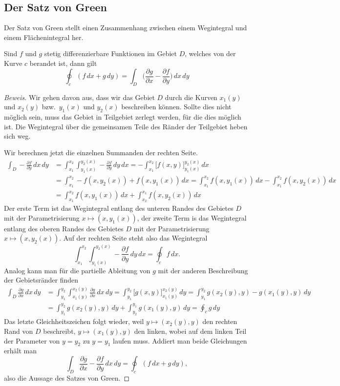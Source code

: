 \subsection{Der Satz von Green%
\label{skript:kruemmung:section:green}}
Der Satz von Green stellt einen Zusammenhang zwischen einem Wegintegral
und einem Flächenintegral her.

\begin{satz}[Green]
\label{skript:kruemmung:satz:green}
Sind $f$ und $g$ stetig differenzierbare Funktionen im Gebiet $D$, welches
von der Kurve $c$ berandet ist, dann gilt
\[
\oint_c (f\,dx + g\,dy)
=
\int_D \biggl(\frac{\partial g}{\partial x}
   -\frac{\partial f}{\partial y}\biggr)\,dx\,dy
\]
\end{satz}
%

\begin{proof}[Beweis]
Wir gehen davon aus, dass wir das Gebiet $D$ durch die Kurven $x_1(y)$
und $x_2(y)$ bzw.~$y_1(x)$ und $y_2(x)$ beschreiben können.
Sollte dies nicht möglich sein, muss das Gebiet in Teilgebiet zerlegt
werden, für die dies möglich ist.
Die Wegintegral über die gemeinsamen Teile des Ränder der Teilgebiet 
heben sich weg.

Wir berechnen jetzt die einzelnen Summanden der rechten Seite.
\begin{align*}
\int_D -\frac{\partial f}{\partial y}\,dx\,dy
&=
\int_{x_1}^{x_2}
\int_{y_1(x)}^{y_2(x)} -\frac{\partial f}{\partial y}\,dy \,dx
=
-\int_{x_1}^{x_2} \biggl[f(x,y)\biggr]_{y_1(x)}^{y_2(x)} 
\,dx
\\
&=
\int_{x_1}^{x_2} -f(x,y_2(x))+f(x,y_1(x))\,dx
=
\int_{x_1}^{x_2} f(x,y_1(x))\,dx - \int_{x_1}^{x_2} f(x,y_2(x))\,dx
\\
&=
\int_{x_1}^{x_2} f(x,y_1(x))\,dx + \int_{x_2}^{x_1} f(x,y_2(x))\,dx
\end{align*}
Der erste Term ist das Wegintegral entlang des unteren Randes des
Gebietes $D$ mit der Parametrisierung $x\mapsto(x,y_1(x))$,
der zweite Term is das Wegintegral entlang des oberen Randes des
Gebietes $D$ mit der Parametrisierung $x\mapsto(x,y_2(x))$.
Auf der rechten Seite steht also das Wegintegral 
\[
\int_{x_1}^{x_2}
\int_{y_1(x)}^{y_2(x)} -\frac{\partial f}{\partial y}\,dy \,dx
=
\oint_c f\,dx.
\]
Analog kann man für die partielle Ableitung von $g$ mit der anderen
Beschreibung der Gebietsränder finden
\begin{align*}
\int_D \frac{\partial g}{\partial x}\,dx\,dy
&=
\int_{y_1}^{y_2}
\int_{x_1(y)}^{x_2(y)} \frac{\partial g}{\partial x}\,dx\,dy
=
\int_{y_1}^{y_2} \biggl[g(x,y)\biggr]_{x_1(y)}^{x_2(y)} \,dy
=
\int_{y_1}^{y_2} g(x_2(y),y) - g(x_1(y),y) \,dy
\\
&=
\int_{y_1}^{y_2} g(x_2(y),y) \,dy + \int_{y_2}^{y_1} g(x_1(y),y)\,dy
=
\oint_c g\,dy
\end{align*}
Das letzte Gleichheitszeichen folgt wieder, weil $y\mapsto (x_2(y),y)$ den
rechten Rand von $D$ beschreibt, $y\mapsto (x_1(y),y)$ den linken,
wobei auf dem linken Teil der Parameter von $y=y_2$ zu $y=y_1$
laufen muss.
Addiert man beide Gleichungen erhält man
\[
\int_D \frac{\partial g}{\partial x}-\frac{\partial f}{\partial y}\,dx\,dy
=
\oint_c (f\,dx + g\,dy),
\]
also die Aussage des Satzes von Green.
\end{proof}

